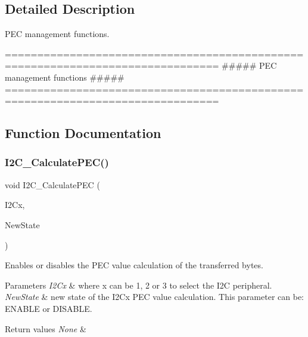 \subsection{Detailed Description}
P\+EC management functions. 

\begin{DoxyVerb} ===============================================================================
                  ##### PEC management functions #####
 ===============================================================================  \end{DoxyVerb}
 

\subsection{Function Documentation}
\mbox{\label{group___i2_c___group3_gae86801251359226c35745e0a258388b0}} 
\subsubsection{\texorpdfstring{I2\+C\+\_\+\+Calculate\+P\+E\+C()}{I2C\_CalculatePEC()}}
{\footnotesize\ttfamily void I2\+C\+\_\+\+Calculate\+P\+EC (\begin{DoxyParamCaption}\item[{I2\+C\+\_\+\+Type\+Def $\ast$}]{I2\+Cx,  }\item[{Functional\+State}]{New\+State }\end{DoxyParamCaption})}



Enables or disables the P\+EC value calculation of the transferred bytes. 


\begin{DoxyParams}{Parameters}
{\em I2\+Cx} & where x can be 1, 2 or 3 to select the I2C peripheral. \\
\hline
{\em New\+State} & new state of the I2\+Cx P\+EC value calculation. This parameter can be\+: E\+N\+A\+B\+LE or D\+I\+S\+A\+B\+LE. \\
\hline
\end{DoxyParams}

\begin{DoxyRetVals}{Return values}
{\em None} & \\
\hline
\end{DoxyRetVals}
\mbox{\label{group___i2_c___group3_ga7bf75e7c27c0e1d73e70fc0e1c7cd1dd}} 
